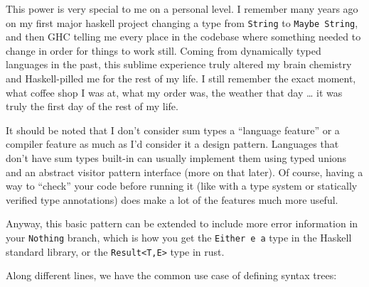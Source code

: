 \documentclass[]{article}
\begin{document}
This power is very special to me on a personal level. I remember many years ago
on my first major haskell project changing a type from \texttt{String} to
\texttt{Maybe\ String}, and then GHC telling me every place in the codebase
where something needed to change in order for things to work still. Coming from
dynamically typed languages in the past, this sublime experience truly altered
my brain chemistry and Haskell-pilled me for the rest of my life. I still
remember the exact moment, what coffee shop I was at, what my order was, the
weather that day \ldots{} it was truly the first day of the rest of my life.

It should be noted that I don't consider sum types a ``language feature'' or a
compiler feature as much as I'd consider it a design pattern. Languages that
don't have sum types built-in can usually implement them using typed unions and
an abstract visitor pattern interface (more on that later). Of course, having a
way to ``check'' your code before running it (like with a type system or
statically verified type annotations) does make a lot of the features much more
useful.

Anyway, this basic pattern can be extended to include more error information in
your \texttt{Nothing} branch, which is how you get the \texttt{Either\ e\ a}
type in the Haskell standard library, or the
\texttt{Result\textless{}T,E\textgreater{}} type in rust.

Along different lines, we have the common use case of defining syntax trees:
\end{document}

